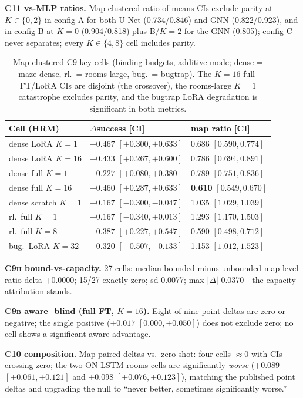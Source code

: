 \documentclass[letterpaper]{article} %
\newcommand{\stage}[1]{\textsc{#1}}
\begin{document}
\textbf{\stage{C11} vs-MLP ratios.} Map-clustered ratio-of-means CIs exclude parity at $K\in\{0,2\}$ in config A for both U-Net (0.734/0.846) and GNN (0.822/0.923), and in config B at $K{=}0$ (0.904/0.818) plus B/$K{=}2$ for the GNN (0.805); config C never separates; every $K\in\{4,8\}$ cell includes parity.

\begin{table}[h]
\centering
\scriptsize
\setlength{\tabcolsep}{2.5pt}
\begin{tabular}{@{}lll@{}}
\toprule
Cell (HRM) & $\Delta$success [CI] & map ratio [CI] \\
\midrule
dense LoRA $K{=}1$ & $+0.467$ $[+0.300,+0.633]$ & 0.686 $[0.590,0.774]$ \\
dense LoRA $K{=}16$ & $+0.433$ $[+0.267,+0.600]$ & 0.786 $[0.694,0.891]$ \\
dense full $K{=}1$ & $+0.227$ $[+0.080,+0.380]$ & 0.789 $[0.751,0.836]$ \\
dense full $K{=}16$ & $+0.460$ $[+0.287,+0.633]$ & \textbf{0.610} $[0.549,0.670]$ \\
dense scratch $K{=}1$ & $-0.167$ $[-0.300,-0.047]$ & 1.035 $[1.029,1.039]$ \\
rl.\ full $K{=}1$ & $-0.167$ $[-0.340,+0.013]$ & 1.293 $[1.170,1.503]$ \\
rl.\ full $K{=}8$ & $+0.387$ $[+0.227,+0.547]$ & 0.590 $[0.498,0.712]$ \\
bug.\ LoRA $K{=}32$ & $-0.320$ $[-0.507,-0.133]$ & 1.153 $[1.012,1.523]$ \\
\bottomrule
\end{tabular}
\caption{Map-clustered \stage{C9} key cells (binding budgets, additive mode; dense = maze-dense, rl.\ = rooms-large, bug.\ = bugtrap). The $K{=}16$ full-FT/LoRA CIs are disjoint (the crossover), the rooms-large $K{=}1$ catastrophe excludes parity, and the bugtrap LoRA degradation is significant in both metrics.}
\label{tab:wcr-c9}
\end{table}

\textbf{\stage{C9h} bound-vs-capacity.} 27 cells: median bounded-minus-unbounded map-level ratio delta $+0.0000$; 15/27 exactly zero; sd 0.0077; max $|\Delta|$ 0.0370---the capacity attribution stands.

\textbf{\stage{C9b} aware$-$blind (full FT, $K{=}16$).} Eight of nine point deltas are zero or negative; the single positive ($+0.017$ $[0.000,+0.050]$) does not exclude zero; no cell shows a significant aware advantage.

\textbf{\stage{C10} composition.} Map-paired deltas vs.\ zero-shot: four cells $\approx$0 with CIs crossing zero; the two ON-LSTM rooms cells are significantly \emph{worse} ($+0.089$ $[+0.061,+0.121]$ and $+0.098$ $[+0.076,+0.123]$), matching the published point deltas and upgrading the null to ``never better, sometimes significantly worse.''
\end{document}
